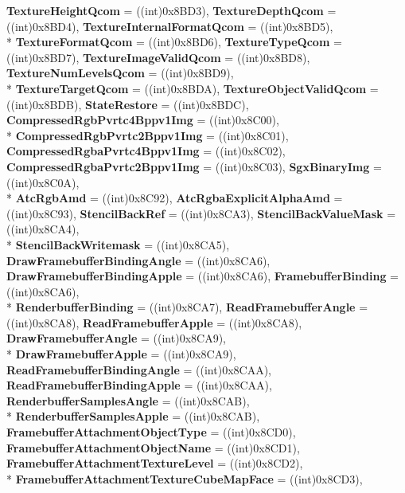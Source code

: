 \begin{DoxyCompactItemize}
{\bfseries Texture\-Height\-Qcom} = ((int)0x8\-B\-D3), 
{\bfseries Texture\-Depth\-Qcom} = ((int)0x8\-B\-D4), 
{\bfseries Texture\-Internal\-Format\-Qcom} = ((int)0x8\-B\-D5), 
\\*
{\bfseries Texture\-Format\-Qcom} = ((int)0x8\-B\-D6), 
{\bfseries Texture\-Type\-Qcom} = ((int)0x8\-B\-D7), 
{\bfseries Texture\-Image\-Valid\-Qcom} = ((int)0x8\-B\-D8), 
{\bfseries Texture\-Num\-Levels\-Qcom} = ((int)0x8\-B\-D9), 
\\*
{\bfseries Texture\-Target\-Qcom} = ((int)0x8\-B\-D\-A), 
{\bfseries Texture\-Object\-Valid\-Qcom} = ((int)0x8\-B\-D\-B), 
{\bfseries State\-Restore} = ((int)0x8\-B\-D\-C), 
{\bfseries Compressed\-Rgb\-Pvrtc4\-Bppv1\-Img} = ((int)0x8\-C00), 
\\*
{\bfseries Compressed\-Rgb\-Pvrtc2\-Bppv1\-Img} = ((int)0x8\-C01), 
{\bfseries Compressed\-Rgba\-Pvrtc4\-Bppv1\-Img} = ((int)0x8\-C02), 
{\bfseries Compressed\-Rgba\-Pvrtc2\-Bppv1\-Img} = ((int)0x8\-C03), 
{\bfseries Sgx\-Binary\-Img} = ((int)0x8\-C0\-A), 
\\*
{\bfseries Atc\-Rgb\-Amd} = ((int)0x8\-C92), 
{\bfseries Atc\-Rgba\-Explicit\-Alpha\-Amd} = ((int)0x8\-C93), 
{\bfseries Stencil\-Back\-Ref} = ((int)0x8\-C\-A3), 
{\bfseries Stencil\-Back\-Value\-Mask} = ((int)0x8\-C\-A4), 
\\*
{\bfseries Stencil\-Back\-Writemask} = ((int)0x8\-C\-A5), 
{\bfseries Draw\-Framebuffer\-Binding\-Angle} = ((int)0x8\-C\-A6), 
{\bfseries Draw\-Framebuffer\-Binding\-Apple} = ((int)0x8\-C\-A6), 
{\bfseries Framebuffer\-Binding} = ((int)0x8\-C\-A6), 
\\*
{\bfseries Renderbuffer\-Binding} = ((int)0x8\-C\-A7), 
{\bfseries Read\-Framebuffer\-Angle} = ((int)0x8\-C\-A8), 
{\bfseries Read\-Framebuffer\-Apple} = ((int)0x8\-C\-A8), 
{\bfseries Draw\-Framebuffer\-Angle} = ((int)0x8\-C\-A9), 
\\*
{\bfseries Draw\-Framebuffer\-Apple} = ((int)0x8\-C\-A9), 
{\bfseries Read\-Framebuffer\-Binding\-Angle} = ((int)0x8\-C\-A\-A), 
{\bfseries Read\-Framebuffer\-Binding\-Apple} = ((int)0x8\-C\-A\-A), 
{\bfseries Renderbuffer\-Samples\-Angle} = ((int)0x8\-C\-A\-B), 
\\*
{\bfseries Renderbuffer\-Samples\-Apple} = ((int)0x8\-C\-A\-B), 
{\bfseries Framebuffer\-Attachment\-Object\-Type} = ((int)0x8\-C\-D0), 
{\bfseries Framebuffer\-Attachment\-Object\-Name} = ((int)0x8\-C\-D1), 
{\bfseries Framebuffer\-Attachment\-Texture\-Level} = ((int)0x8\-C\-D2), 
\\*
{\bfseries Framebuffer\-Attachment\-Texture\-Cube\-Map\-Face} = ((int)0x8\-C\-D3), 

\end{DoxyCompactItemize}
